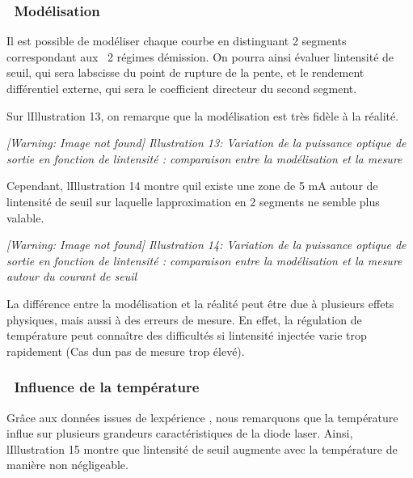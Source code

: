 \documentclass[12pt,twoside]{article}
\begin{document}
\subsubsection[\ Mod\'elisation]{\ Mod\'elisation}
Il est possible de mod\'eliser chaque courbe en distinguant 2 segments
correspondant aux \ 2 r\'egimes d{\textquotesingle}\'emission. On
pourra ainsi \'evaluer l{\textquotesingle}intensit\'e de seuil, qui
sera l{\textquotesingle}abscisse du point de rupture de la pente, et le
rendement diff\'erentiel externe, qui sera le coefficient directeur du
second segment.

Sur l{\textquotesingle}Illustration 13, on remarque que la
mod\'elisation est tr\`es fid\`ele \`a la r\'ealit\'e.

{\mdseries\upshape
\begin{minipage}{15.334cm}
{\itshape
 [Warning: Image not found] Illustration
13\label{seq:refIllustration12}: Variation de la puissance optique de
sortie en fonction de l{\textquotesingle}intensit\'e : comparaison
entre la mod\'elisation et la mesure}
\end{minipage}}

Cependant, l{\textquotesingle}Illustration 14 montre
qu{\textquotesingle}il existe une zone de 5 mA autour de
l{\textquotesingle}intensit\'e de seuil sur laquelle
l{\textquotesingle}approximation en 2 segments ne semble plus valable.

\begin{minipage}{15.334cm}
{\itshape
 [Warning: Image not found] Illustration
14\label{seq:refIllustration13}: Variation de la puissance optique de
sortie en fonction de l{\textquotesingle}intensit\'e : comparaison
entre la mod\'elisation et la mesure autour du courant de seuil}
\end{minipage}

La diff\'erence entre la mod\'elisation et la r\'ealit\'e peut \^etre
due \`a plusieurs effets physiques, mais aussi \`a des erreurs de
mesure. En effet, la r\'egulation de temp\'erature peut conna\^itre des
difficult\'es si l{\textquotesingle}intensit\'e inject\'ee varie trop
rapidement (Cas d{\textquotesingle}un pas de mesure trop \'elev\'e).

\subsubsection[\ Influence de la temp\'erature]{\ Influence de la
temp\'erature}
Gr\^ace aux donn\'ees issues de l{\textquotesingle}exp\'erience , nous
remarquons que la temp\'erature influe sur plusieurs grandeurs
caract\'eristiques de la diode laser. Ainsi,
l{\textquotesingle}Illustration 15 montre que
l{\textquotesingle}intensit\'e de seuil augmente avec la temp\'erature
de mani\`ere non n\'egligeable.
\end{document}
